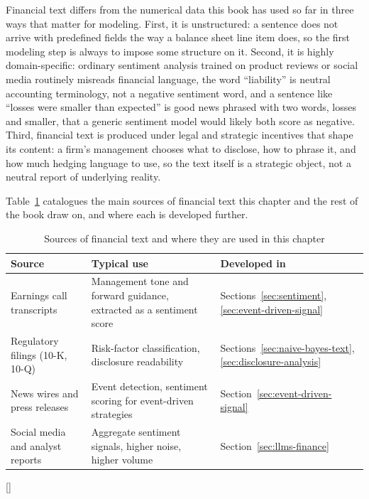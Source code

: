 \documentclass[../ai_in_finance]{subfiles}
\begin{document}
Financial text differs from the numerical data this book has used so far in three ways that matter for modeling. First, it is unstructured: a sentence does not arrive with predefined fields the way a balance sheet line item does, so the first modeling step is always to impose some structure on it. Second, it is highly domain-specific: ordinary sentiment analysis trained on product reviews or social media routinely misreads financial language, the word ``liability'' is neutral accounting terminology, not a negative sentiment word, and a sentence like ``losses were smaller than expected'' is good news phrased with two words, losses and smaller, that a generic sentiment model would likely both score as negative. Third, financial text is produced under legal and strategic incentives that shape its content: a firm's management chooses what to disclose, how to phrase it, and how much hedging language to use, so the text itself is a strategic object, not a neutral report of underlying reality.

Table~\ref{tab:text_sources} catalogues the main sources of financial text this chapter and the rest of the book draw on, and where each is developed further.

\begin{table}[htbp]
\centering
\begin{lrbox}{\bookmeasuredbox}
\begin{tabular}{p{3.0cm}p{5.6cm}p{3.6cm}}
\toprule
Source & Typical use & Developed in \\
\midrule
Earnings call transcripts & Management tone and forward guidance, extracted as a sentiment score & Sections~\ref{sec:sentiment}, \ref{sec:event-driven-signal} \\
Regulatory filings (10-K, 10-Q) & Risk-factor classification, disclosure readability & Sections~\ref{sec:naive-bayes-text}, \ref{sec:disclosure-analysis} \\
News wires and press releases & Event detection, sentiment scoring for event-driven strategies & Section~\ref{sec:event-driven-signal} \\
Social media and analyst reports & Aggregate sentiment signals, higher noise, higher volume & Section~\ref{sec:llms-finance} \\
\bottomrule
\end{tabular}
\end{lrbox}
\ifdim\wd\bookmeasuredbox<0.65\linewidth
\setlength{\bookcapwidth}{0.65\linewidth}
\else
\setlength{\bookcapwidth}{\wd\bookmeasuredbox}
\fi
{}[\bookcapwidth]{
\usebox{\bookmeasuredbox}
}{
\caption{Sources of financial text and where they are used in this chapter}
\label{tab:text_sources}
}
\end{table}
\end{document}
